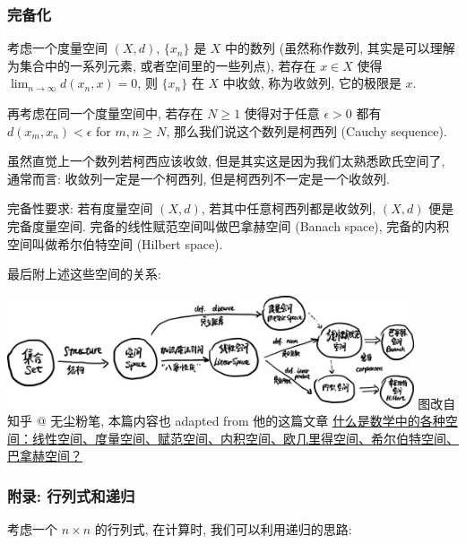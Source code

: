 \subsubsection{完备化}

考虑一个度量空间 $(X,d)$, $\{x_n\}$ 是 $X$ 中的数列 (虽然称作数列,
其实是可以理解为集合中的一系列元素, 或者空间里的一些列点), 若存在
$x\in X$ 使得 $\lim_{n\rightarrow\infty}d(x_n,x)=0$, 则 $\{x_n\}$
在 $X$ 中收敛, 称为收敛列, 它的极限是 $x$.

再考虑在同一个度量空间中, 若存在 $N\ge1$ 使得对于任意 $\epsilon>0$
都有 $d(x_m,x_n)<\epsilon$ for $m,n\ge N$,
那么我们说这个数列是柯西列 (Cauchy sequence).

虽然直觉上一个数列若柯西应该收敛, 但是其实这是因为我们太熟悉欧氏空间了,
通常而言: 收敛列一定是一个柯西列, 但是柯西列不一定是一个收敛列.

完备性要求: 若有度量空间 $(X,d)$, 若其中任意柯西列都是收敛列,
$(X,d)$ 便是完备度量空间. 完备的线性赋范空间叫做巴拿赫空间 (Banach
space), 完备的内积空间叫做希尔伯特空间 (Hilbert space).

最后附上述这些空间的关系:

\begin{tcolorbox}[size=fbox, breakable, enhanced jigsaw]
  \includegraphics[width=0.9\textwidth]{img/image-20231218171032793.png}
图改自知乎 @ 无尘粉笔, 本篇内容也 adapted from 他的这篇文章
\href{https://zhuanlan.zhihu.com/p/541226732}{什么是数学中的各种空间：线性空间、度量空间、赋范空间、内积空间、欧几里得空间、希尔伯特空间、巴拿赫空间？}
\end{tcolorbox}

\subsubsection{附录: 行列式和递归}

考虑一个 $n\times n$ 的行列式, 在计算时, 我们可以利用递归的思路:

